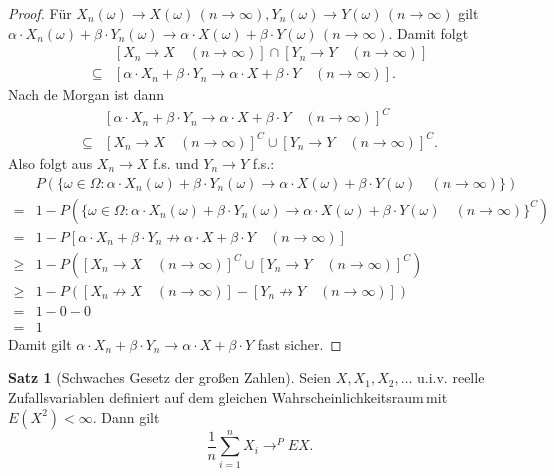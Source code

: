 \documentclass[a4paper,12pt,fleqn]{scrartcl}
\newcommand{\WR}{Wahrscheinlichkeitsraum}
\newcommand{\ZV}{Zufallsvariable}
\theoremstyle{definition}
\newtheorem{satz}[definition]{Satz}
\theoremstyle{plain}
\theoremstyle{remark}
\begin{document}
\begin{proof}
Für $X_n(\omega) \rightarrow X(\omega) \, (n \rightarrow \infty), Y_n(\omega) \rightarrow Y(\omega) \, (n \rightarrow \infty)$ gilt $\alpha \cdot X_n(\omega) + \beta \cdot Y_n(\omega) \rightarrow \alpha \cdot X(\omega) + \beta \cdot Y(\omega) \, (n \rightarrow \infty)$. Damit folgt
\begin{align*}
&[X_n \rightarrow X \quad (n \rightarrow \infty)] \cap [Y_n \rightarrow Y \quad (n \rightarrow \infty)] \\
\subseteq&[\alpha \cdot X_n + \beta \cdot Y_n \rightarrow \alpha \cdot X + \beta \cdot Y \quad (n \rightarrow \infty)].
\end{align*}
Nach de Morgan ist dann
\begin{align*}
&[\alpha \cdot X_n + \beta \cdot Y_n \rightarrow \alpha \cdot X + \beta \cdot Y \quad (n \rightarrow \infty)]^C \\
\subseteq&[X_n \rightarrow X \quad (n \rightarrow \infty)]^C \cup [Y_n \rightarrow Y \quad (n \rightarrow \infty)]^C.
\end{align*}
Also folgt aus $X_n \rightarrow X$ f.s. und $Y_n \rightarrow Y$ f.s.:
\begin{align*}
&P(\{\omega \in \Omega : \alpha \cdot X_n(\omega) + \beta \cdot Y_n(\omega) \rightarrow \alpha \cdot X(\omega) + \beta \cdot Y(\omega) \quad (n \rightarrow \infty)\}) \\
=&1 - P(\{\omega \in \Omega : \alpha \cdot X_n(\omega) + \beta \cdot Y_n(\omega) \rightarrow \alpha \cdot X(\omega) + \beta \cdot Y(\omega) \quad (n \rightarrow \infty)\}^C) \\
=&1 - P[\alpha \cdot X_n + \beta \cdot Y_n \not\rightarrow \alpha \cdot X + \beta \cdot Y \quad (n \rightarrow \infty)] \\
\geq& 1 - P([X_n \rightarrow X \quad (n \rightarrow \infty)]^C \cup [Y_n \rightarrow Y \quad (n \rightarrow \infty)]^C) \tag{$P$ monoton} \\
\geq& 1 - P([X_n \not\rightarrow X \quad (n \rightarrow \infty)] - [Y_n \not\rightarrow Y \quad (n \rightarrow \infty)]) \tag{$P$ subadditiv}\\
=& 1 - 0 - 0 \\
=& 1
\end{align*}
Damit gilt $\alpha \cdot X_n + \beta \cdot Y_n \rightarrow \alpha \cdot X + \beta \cdot Y$ fast sicher.
\end{proof}
\begin{satz}[Schwaches Gesetz der großen Zahlen]
Seien $X, X_1, X_2, \ldots$ u.i.v. reelle \ZV n definiert auf dem gleichen \WR \,mit $E(X^2) < \infty$. Dann gilt
\[\frac{1}{n} \sum_{i=1}^n X_i \rightarrow^P EX.\]
\end{satz}
\end{document}
